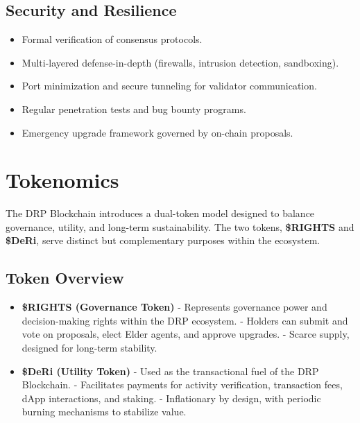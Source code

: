 \documentclass[11pt,a4paper]{article}
\begin{document}
\subsection{Security and Resilience}
\begin{itemize}
    \item Formal verification of consensus protocols.  
    \item Multi-layered defense-in-depth (firewalls, intrusion detection, sandboxing).  
    \item Port minimization and secure tunneling for validator communication.  
    \item Regular penetration tests and bug bounty programs.  
    \item Emergency upgrade framework governed by on-chain proposals.  
\end{itemize}

\section{Tokenomics}

The DRP Blockchain introduces a dual-token model designed to balance governance, utility, and long-term sustainability. The two tokens, \textbf{\$RIGHTS} and \textbf{\$DeRi}, serve distinct but complementary purposes within the ecosystem.

\subsection{Token Overview}
\begin{itemize}
    \item \textbf{\$RIGHTS (Governance Token)}  
    - Represents governance power and decision-making rights within the DRP ecosystem.  
    - Holders can submit and vote on proposals, elect Elder agents, and approve upgrades.  
    - Scarce supply, designed for long-term stability.  

    \item \textbf{\$DeRi (Utility Token)}  
    - Used as the transactional fuel of the DRP Blockchain.  
    - Facilitates payments for activity verification, transaction fees, dApp interactions, and staking.  
    - Inflationary by design, with periodic burning mechanisms to stabilize value.  
\end{itemize}
\end{document}
